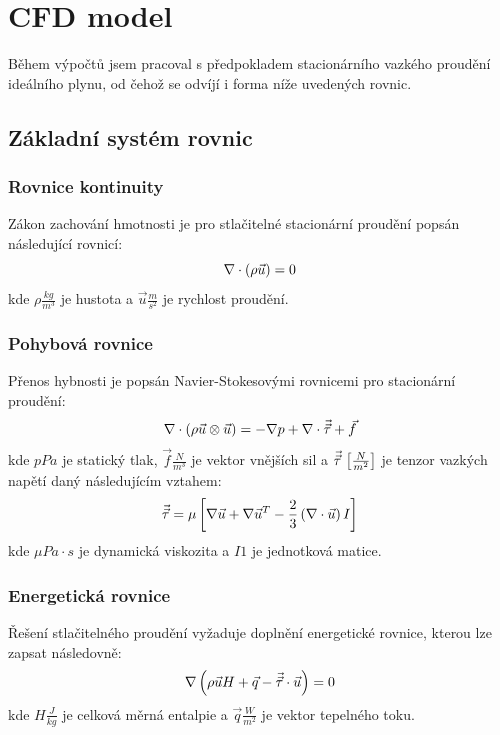 \section{CFD model}
    Během výpočtů jsem pracoval s předpokladem stacionárního vazkého proudění ideálního plynu, od čehož se odvíjí i forma níže uvedených rovnic. 
    \subsection{Základní systém rovnic}
        
        \subsubsection{Rovnice kontinuity}
            Zákon zachování hmotnosti je pro stlačitelné stacionární proudění popsán následující rovnicí:
            \begin{equation} \label{eq:rovnice-kontinuity}
                \nabla \cdot  \left( \rho \Vec{u} \right) = 0  
            \end{equation}
            \noindent kde $\rho \unit{\frac{kg}{m^3}}$ je hustota a $\Vec{u} \unit{\frac{m}{s^2}}$  je rychlost proudění.
        
        \subsubsection{Pohybová rovnice}
            Přenos hybnosti je popsán Navier-Stokesovými rovnicemi pro stacionární proudění:
            \begin{equation} \label{eq:pohybova-rovnice}
                \nabla \cdot \left( \rho \Vec{u} \otimes \Vec{u} \right) = - \nabla p + \nabla \cdot \Vec{\Vec{\tau}} + \Vec{f}
            \end{equation}
            \noindent kde $p \unit{Pa}$ je statický tlak, $\Vec{f} \unit{\frac{N}{m^3}}$ je vektor vnějších sil a $\Vec{\Vec{\tau}} \, \left[ \frac{N}{m^2} \right]$ je tenzor vazkých napětí daný následujícím vztahem:
            \begin{equation} \label{eq:tenzor-vazkych-napeti}
                \Vec{\Vec{\tau}} = \mu \left[ \nabla \Vec{u} + \nabla \Vec{u}^T - \frac{2}{3} \left( \nabla \cdot \Vec{u} \right) I \right]
            \end{equation}
            \noindent kde $\mu \unit{Pa \cdot s}$ je dynamická viskozita a $I \unit{1}$ je jednotková matice.
            
        \subsubsection{Energetická rovnice}
            Řešení stlačitelného proudění vyžaduje doplnění energetické rovnice, kterou lze zapsat následovně:
            \begin{equation} \label{eq:energeticka-rovnice}
                \nabla \left( \rho \Vec{u} H + \Vec{q} - \Vec{\Vec{\tau}} \cdot \Vec{u} \right) = 0
            \end{equation}
            \noindent kde $H \unit{\frac{J}{kg}}$ je celková měrná entalpie a $\Vec{q} \unit{\frac{W}{m^2}}$ je vektor tepelného toku.
